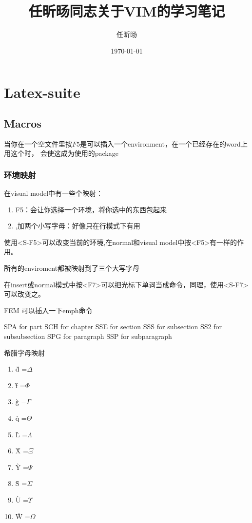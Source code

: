 \documentclass[12pt]{article}
\title{任昕旸同志关于VIM的学习笔记}
\author{任昕旸}
\date{\today}
\begin{document}
\maketitle
\section{Latex-suite}
\subsection{Macros}
当你在一个空文件里按$F5$是可以插入一个environment，在一个已经存在的word上用这个时，
会使这成为使用的package
\subsubsection{环境映射}
在visual model中有一些个映射：

\begin{enumerate}
    \item F5：会让你选择一个环境，将你选中的东西包起来
    \item ,加两个小写字母：好像只在行模式下有用
\end{enumerate}

使用<S-F5>可以改变当前的环境,在normal和visual model中按<F5>有一样的作用。

所有的enviroment都被映射到了三个大写字母

在insert或normal模式中按<F7>可以把光标下单词当成命令，同理，使用<S-F7>可以改变之。

FEM 可以插入一下emph命令


    SPA for part
    SCH for chapter
    SSE for section
    SSS for subsection
    SS2 for subsubsection
    SPG for paragraph
    SSP for subparagraph


希腊字母映射
\begin{enumerate}
    \item \`d =$ \Delta$
    \item \`f =$ \Phi$
    \item \`g =$ \Gamma$
    \item \`q =$ \Theta$
    \item \`L =$ \Lambda$
    \item \`X =$ \Xi$
    \item \`Y =$ \Psi$
    \item \`S =$ \Sigma$
    \item \`U =$ \Upsilon$
    \item \`W =$ \Omega$
\end{enumerate}
\end{document}
